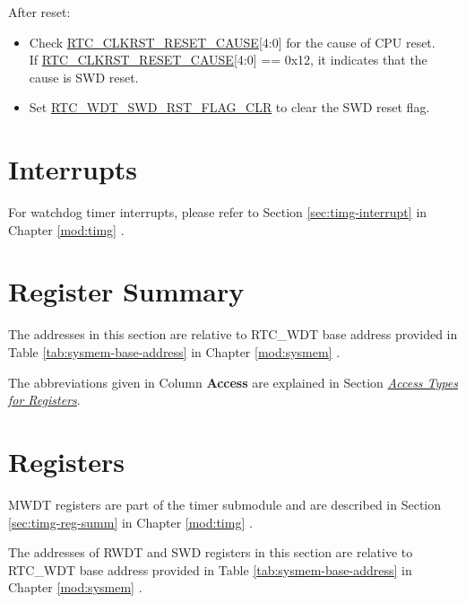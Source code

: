 \documentclass[main\_\_EN.tex]{subfiles}
\begin{document}
After reset:
\begin{itemize}
    \item Check \hyperref[fielddesc:RTCCLKRSTRESETCAUSE]{RTC\_CLKRST\_RESET\_CAUSE}[4:0] for the cause of CPU reset.\\
	If \hyperref[fielddesc:RTCCLKRSTRESETCAUSE]{RTC\_CLKRST\_RESET\_CAUSE}[4:0] == 0x12, it indicates that the cause is SWD reset.
	\item Set \hyperref[fielddesc:RTCWDTSWDRSTFLAGCLR]{RTC\_WDT\_SWD\_RST\_FLAG\_CLR} to clear the SWD reset flag.
\end{itemize}

\section{Interrupts}

For watchdog timer interrupts, please refer to Section \ref{sec:timg-interrupt} \textit{} in Chapter \ref{mod:timg} \textit{}.



\clearpage
\hypertarget{wdt-reg-summ}{}
\section{Register Summary}
\label{sec:wdt-reg-summ}

The addresses in this section are relative to RTC\_WDT base address provided in Table \ref{tab:sysmem-base-address} in Chapter \ref{mod:sysmem} \textit{}.

The abbreviations given in Column \textbf{Access} are explained in Section \hyperref[glossary-access-types]{\textit{Access Types for Registers}}.




\clearpage
\section{Registers}

MWDT registers are part of the timer submodule and are described in Section \ref{sec:timg-reg-summ} \textit{} in Chapter \ref{mod:timg} \textit{}.

The addresses of RWDT and SWD registers in this section are relative to RTC\_WDT base address provided in Table \ref{tab:sysmem-base-address} in Chapter \ref{mod:sysmem} \textit{}.


\end{document}
